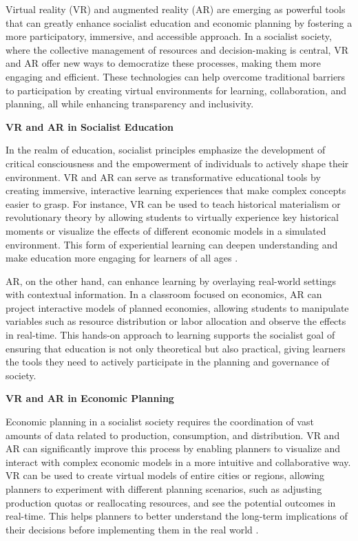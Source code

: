 \begin{refsection}
Virtual reality (VR) and augmented reality (AR) are emerging as powerful tools that can greatly enhance socialist education and economic planning by fostering a more participatory, immersive, and accessible approach. In a socialist society, where the collective management of resources and decision-making is central, VR and AR offer new ways to democratize these processes, making them more engaging and efficient. These technologies can help overcome traditional barriers to participation by creating virtual environments for learning, collaboration, and planning, all while enhancing transparency and inclusivity.

\textbf{VR and AR in Socialist Education}

In the realm of education, socialist principles emphasize the development of critical consciousness and the empowerment of individuals to actively shape their environment. VR and AR can serve as transformative educational tools by creating immersive, interactive learning experiences that make complex concepts easier to grasp. For instance, VR can be used to teach historical materialism or revolutionary theory by allowing students to virtually experience key historical moments or visualize the effects of different economic models in a simulated environment. This form of experiential learning can deepen understanding and make education more engaging for learners of all ages \cite[pp.~45-50]{freire_pedagogy_2021}.

AR, on the other hand, can enhance learning by overlaying real-world settings with contextual information. In a classroom focused on economics, AR can project interactive models of planned economies, allowing students to manipulate variables such as resource distribution or labor allocation and observe the effects in real-time. This hands-on approach to learning supports the socialist goal of ensuring that education is not only theoretical but also practical, giving learners the tools they need to actively participate in the planning and governance of society.

\textbf{VR and AR in Economic Planning}

Economic planning in a socialist society requires the coordination of vast amounts of data related to production, consumption, and distribution. VR and AR can significantly improve this process by enabling planners to visualize and interact with complex economic models in a more intuitive and collaborative way. VR can be used to create virtual models of entire cities or regions, allowing planners to experiment with different planning scenarios, such as adjusting production quotas or reallocating resources, and see the potential outcomes in real-time. This helps planners to better understand the long-term implications of their decisions before implementing them in the real world \cite[pp.~230-235]{wright_real_utopias}.


\end{refsection}
